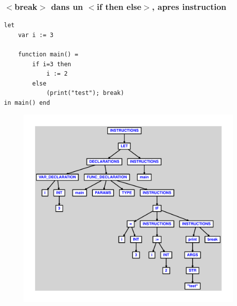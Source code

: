 \documentclass{article}
\begin{document}
\subsubsection{$ < $break$ > $ dans un $ < $if then else$ > $, apres instruction}
\begin{lstlisting}
let
	var i := 3

	function main() =
		if i=3 then
			i := 2
		else
			(print("test"); break)
in main() end
\end{lstlisting}
\newpage
\begin{figure}[H]
\centering
\includegraphics[max width=\textwidth]{ast/ast_18.pdf}
\end{figure}
\newpage
\end{document}
